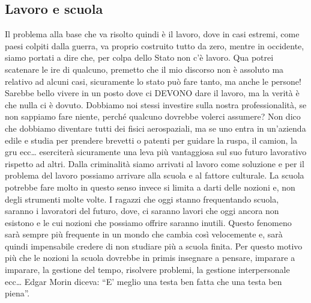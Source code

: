 \documentclass[12pt]{book} %
\begin{document}
\subsection{Lavoro e scuola}
Il problema alla base che va risolto quindi è il lavoro, dove in casi estremi, come paesi colpiti dalla guerra, va
proprio costruito tutto da zero, mentre in occidente, siamo portati a dire che, per colpa dello Stato non
c'è lavoro. Qua potrei scatenare le ire di qualcuno, premetto che il mio discorso non è assoluto
ma relativo ad alcuni casi, sicuramente lo stato può fare tanto, ma anche le persone! Sarebbe bello vivere in un posto
dove ci DEVONO dare il lavoro, ma la verità è che nulla ci è dovuto. Dobbiamo noi stessi investire sulla nostra
professionalità, se non sappiamo fare niente, perché qualcuno dovrebbe volerci assumere? Non dico che dobbiamo
diventare tutti dei fisici aerospaziali, ma se uno entra in un'azienda edile e studia per prendere
brevetti o patenti per guidare la ruspa, il camion, la gru ecc… eserciterà sicuramente una leva più vantaggiosa sul suo
futuro lavorativo rispetto ad altri. Dalla criminalità siamo arrivati al lavoro come soluzione e per il problema del
lavoro possiamo arrivare alla scuola e al fattore culturale. La scuola potrebbe fare molto in questo senso invece si
limita a darti delle nozioni e, non degli strumenti molte volte. I ragazzi che oggi stanno frequentando scuola, saranno
i lavoratori del futuro, dove, ci saranno lavori che oggi ancora non esistono e le cui nozioni che possiamo offrire
saranno inutili. Questo fenomeno sarà sempre più frequente in un mondo che cambia così velocemente e, sarà quindi
impensabile credere di non studiare più a scuola finita. Per questo motivo più che le nozioni la scuola dovrebbe in
primis insegnare a pensare, imparare a imparare, la gestione del tempo, risolvere problemi, la gestione interpersonale
ecc… Edgar Morin diceva: “E' meglio una testa ben fatta che una testa ben piena”.
\end{document}
